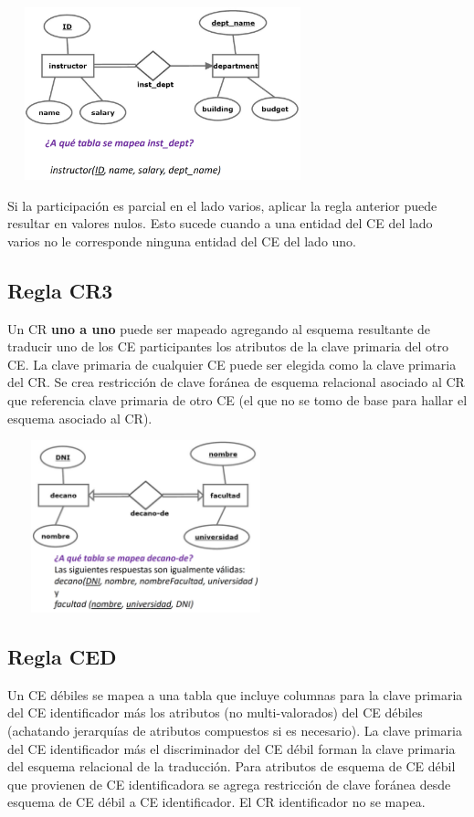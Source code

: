 \documentclass[12pt,a4paper]{report}
\begin{document}
			\begin{center}
				\includegraphics[width=9cm, height=5cm]{./imagenes/cr2.png}
			\end{center}

			\par Si la participación es parcial en el lado varios, aplicar la regla anterior puede resultar en valores nulos. Esto sucede cuando a una entidad del CE del lado varios no le corresponde ninguna entidad del CE del lado uno.
		
		\subsection{Regla CR3}
			\par Un CR \textbf{uno a uno} puede ser mapeado agregando al esquema resultante de traducir uno de los CE participantes los atributos de la clave primaria del otro CE. La clave primaria de cualquier CE puede ser elegida como la clave primaria del CR. Se crea restricción de clave foránea de esquema relacional asociado al CR que referencia clave primaria de otro CE (el que no se tomo de base para hallar el esquema asociado al CR).

			\begin{center}
				\includegraphics[width=8cm, height=5cm]{./imagenes/cr3.png}
			\end{center}

		\subsection{Regla CED}
			\par Un CE débiles se mapea a una tabla que incluye columnas para la clave primaria del CE identificador más los atributos (no multi-valorados) del CE débiles (achatando jerarquías de atributos compuestos si es necesario). La clave primaria del CE identificador más el discriminador del CE débil forman la clave primaria del esquema relacional de la traducción. Para atributos de esquema de CE débil que provienen de CE identificadora se agrega restricción de clave foránea desde esquema de CE débil a CE identificador. El CR identificador no se mapea.
\end{document}
